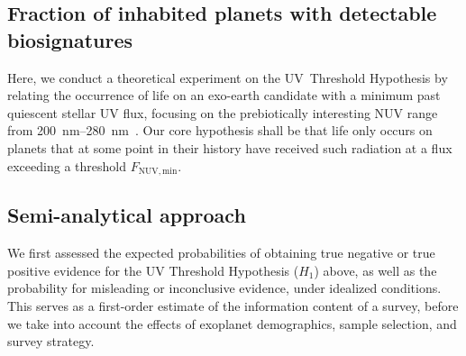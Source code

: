 \documentclass[twocolumn,twocolappendix,linenumbers]{aastex631}
\begin{document}
\subsection{Fraction of inhabited planets with detectable biosignatures}
%
%
Here, we conduct a theoretical experiment on the UV~Threshold Hypothesis by relating the occurrence of life on an exo-earth candidate with a minimum past quiescent stellar \gls{UV} flux, focusing on the prebiotically interesting \gls{NUV} range from \SIrange{200}{280}{\nano\meter}~\citep{Ranjan2016}.
Our core hypothesis shall be that life only occurs on planets that at some point in their history have received such radiation at a flux exceeding a threshold $F_\mathrm{NUV, min}$.


\subsection{Semi-analytical approach}\label{sec:met-semianalytical}
We first assessed the expected probabilities of obtaining true negative or true positive evidence for the UV Threshold Hypothesis ($H_1$) above, as well as the probability for misleading or inconclusive evidence, under idealized conditions.
This serves as a first-order estimate of the information content of a survey, before we take into account the effects of exoplanet demographics, sample selection, and survey strategy.
\end{document}
